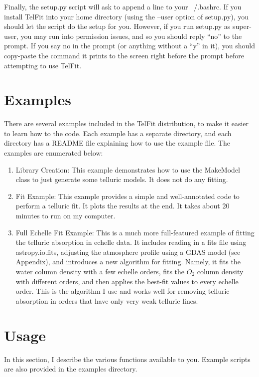 \documentclass{article}
\begin{document}
Finally, the setup.py script will ask to append a line to your ~/.bashrc. If you install TelFit into your home directory (using the --user option of setup.py), you should let the script do the setup for you. However, if you run setup.py as super-user, you may run into permission issues, and so you should reply ``no'' to the prompt. If you say no in the prompt (or anything without a ``y'' in it), you should copy-paste the command it prints to the screen right before the prompt before attempting to use TelFit. 


\section{Examples}
\label{sec:examples}

There are several examples included in the TelFit distribution, to make it easier to learn how to the code. Each example has a separate directory, and each directory has a README file explaining how to use the example file. The examples are enumerated below:

\begin{enumerate}
  \item Library Creation: This example demonstrates how to use the MakeModel class to just generate some telluric models. It does not do any fitting.

  \item Fit Example: This example provides a simple and well-annotated code to perform a telluric fit. It plots the results at the end. It takes about 20 minutes to run on my computer.

  \item Full Echelle Fit Example: This is a much more full-featured example of fitting the telluric absorption in echelle data. It includes reading in a fits file using astropy.io.fits, adjusting the atmosphere profile using a GDAS model (see Appendix), and introduces a new algorithm for fitting. Namely, it fits the water column density with a few echelle orders, fits the $O_2$ column density with different orders, and then applies the best-fit values to every echelle order. This is the algorithm I use and works well for removing telluric absorption in orders that have only very weak telluric lines.
\end{enumerate}


\section{Usage}
\label{sec:usage}
In this section, I describe the various functions available to you. Example scripts are also provided in the examples directory. 
\end{document}
